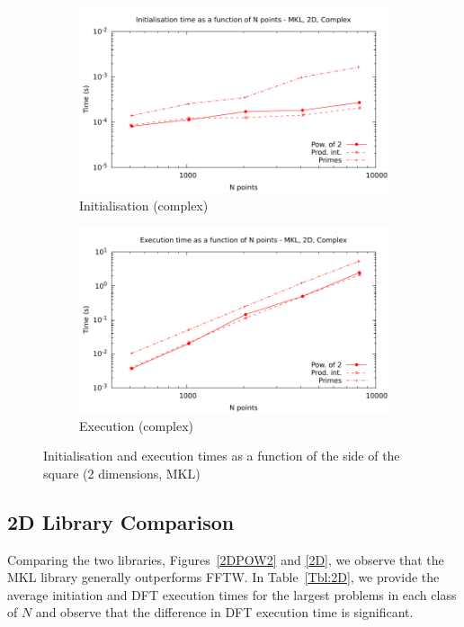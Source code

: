\documentclass[12pt, a4paper]{article} \setlength{\textheight}{24cm}
\begin{document}
\begin{figure}[H]
\begin{subfigure}{.5\textwidth}
    \includegraphics[width=.9\linewidth]{graphs/2d-mkl-init-c.pdf}
    \caption{Initialisation (complex)}
    \label{2DMKLCI}
  \end{subfigure}%
  \begin{subfigure}{.5\textwidth}
    \centering
    \includegraphics[width=.9\linewidth]{graphs/2d-mkl-exec-c.pdf}
    \caption{Execution (complex)}
    \label{2DMKLC}
  \end{subfigure}
  \caption{Initialisation and execution times as a function of the
    side of the square (2 dimensions, MKL)}
  \label{2DMKL}
\end{figure}






\subsection{2D Library Comparison}
Comparing the two libraries, Figures~\ref{2DPOW2} and \ref{2D}, we
observe that the MKL library generally outperforms FFTW. In
Table~\ref{Tbl:2D}, we provide the average initiation and DFT
execution times for the largest problems in each class of $N$ and
observe that the difference in DFT execution time is significant.
\end{document}
